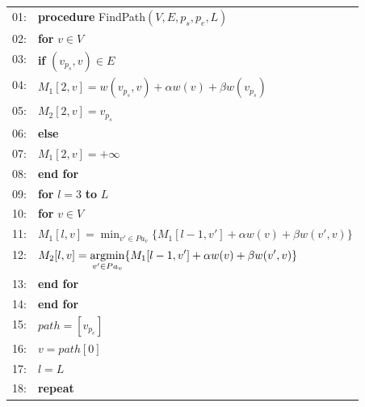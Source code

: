 \begin{figure}
\centering
\begin{tabular}{p{3pt}l}
01:&\textbf{procedure} FindPath$(V, E, p_s, p_e, L)$ \\
02:&\hspace{10pt} \textbf{for} $v \in V$ \\
03:&\hspace{20pt}     \textbf{if} $(v_{p_s}, v) \in E$ \\
04:&\hspace{30pt}         $M_1[2, v] = w(v_{p_s}, v) + \alpha w(v) + \beta w(v_{p_s})$ \\
05:&\hspace{30pt}         $M_2[2, v] = v_{p_s}$ \\
06:&\hspace{20pt}     \textbf{else} \\
07:&\hspace{30pt}         $M_1[2, v] = +\infty$ \\
08:&\hspace{10pt} \textbf{end for} \\
09:&\hspace{10pt} \textbf{for} $l=3$ \textbf{to} $L$ \\
10:&\hspace{20pt}     \textbf{for} $v \in V$ \\
11:&\hspace{30pt}         \(\displaystyle M_1[l, v] = \min_{v' \in Pa_v} \{ M_1[l-1, v'] + \alpha w(v) + \beta w(v', v) \} \) \\
12:&\hspace{30pt}         \(\displaystyle M_2[l, v] = \operatorname*{argmin}_{v' \in Pa_v} \{ M_1[l-1, v'] + \alpha w(v) + \beta w(v', v) \} \)\\
13:&\hspace{20pt}     \textbf{end for} \\
14:&\hspace{10pt} \textbf{end for} \\
15:&\hspace{10pt} $path = [v_{p_e}]$ \\
16:&\hspace{10pt} $v = path[0]$ \\
17:&\hspace{10pt} $l = L$ \\
18:&\hspace{10pt} \textbf{repeat} \\

\end{tabular}
\end{figure}
